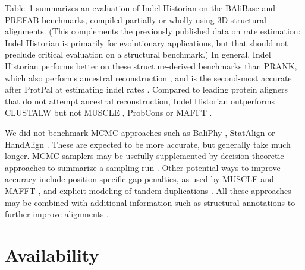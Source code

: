 \documentclass{bioinfo}
\begin{document}
Table~1 summarizes an evaluation of Indel Historian
on the BAliBase and PREFAB benchmarks,
compiled partially or wholly using 3D structural alignments.
(This complements the previously published data on rate estimation:
Indel Historian is primarily for evolutionary applications,
but that should not preclude critical evaluation on a structural benchmark.)
In general, Indel Historian performs better on these structure-derived benchmarks than PRANK,
which also performs ancestral reconstruction \citep{LoytynojaGoldman2008},
and is the second-most accurate after ProtPal at estimating indel rates \citep{Westesson2012-zg}.
Compared to leading protein aligners that do not attempt ancestral reconstruction,
Indel Historian outperforms CLUSTALW \citep{LarkinEtAl2007} but not MUSCLE \citep{Edgar2004b},
ProbCons \citep{DoEtAl2005} or MAFFT \citep{KatohEtAl2005}.

We did not benchmark MCMC approaches
such as BaliPhy \citep{Redelings2014}, StatAlign \citep{NovakEtAl2008} or HandAlign \citep{WestessonBarquistHolmes2012}.
These are expected to be more accurate, but generally take much longer.
MCMC samplers may be usefully supplemented by decision-theoretic approaches to summarize a sampling run \citep{HermanEtAl2015}.
Other potential ways to improve accuracy include position-specific gap penalties, as used by MUSCLE \citep{Edgar2004b} and MAFFT \citep{KatohEtAl2005},
and explicit modeling of tandem duplications \citep{SzalkowskiAnisimova2013}.
All these approaches may be combined with additional information such as structural annotations to further improve alignments \citep{HermanEtAl2014}.

% 
% 
% 



\section{Availability}
\end{document}
